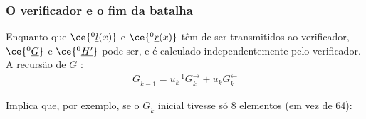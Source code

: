 \subsubsection{O verificador e o fim da batalha}
\label{sec:bullet_fim}

Enquanto que $\ce{^{0}_{\ }\underline{l}(x)}$ e $\ce{^{0}_{\ }\underline{r}(x)}$ têm de ser transmitidos ao verificador, $\ce{^{0}_{\ }\underline{G}}$ e $\ce{^{0}_{\ }\underline{H'}}$ pode ser, e é calculado independentemente pelo verificador. A recursão de $G$ :
\begin{align*}
\underline{G}_{k-1} = u^{-1}_{k} \underline{G}_{k}^{\rightarrow} + u_{k} \underline{G}_{k}^{\leftarrow}
\end{align*}

Implica que, por exemplo, se o $\underline{G}_{k}$ inicial tivesse só 8 elementos (em vez de 64):

